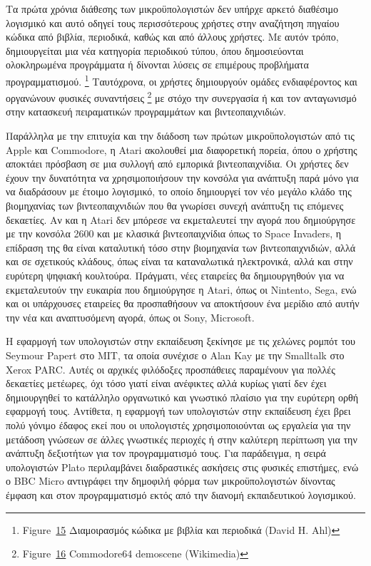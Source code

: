 \documentclass[
]{article}
\begin{document}
Τα πρώτα χρόνια διάθεσης των μικροϋπολογιστών δεν υπήρχε αρκετό
διαθέσιμο λογισμικό και αυτό οδηγεί τους περισσότερους χρήστες στην
αναζήτηση πηγαίου κώδικα από βιβλία, περιοδικά, καθώς και από άλλους
χρήστες. Με αυτόν τρόπο, δημιουργείται μια νέα κατηγορία περιοδικού
τύπου, όπου δημοσιεύονται ολοκληρωμένα προγράμματα ή δίνονται λύσεις σε
επιμέρους προβλήματα προγραμματισμού. \footnote{Figure~\protect\hyperlink{fig:printed-code}{15}
  Διαμοιρασμός κώδικα με βιβλία και περιοδικά (David H. Ahl)}
Ταυτόχρονα, οι χρήστες δημιουργούν ομάδες ενδιαφέροντος και οργανώνουν
φυσικές συναντήσεις \footnote{Figure~\protect\hyperlink{fig:c64-demoscene}{16}
  Commodore64 demoscene (Wikimedia)} με στόχο την συνεργασία ή και τον
ανταγωνισμό στην κατασκευή πειραματικών προγραμμάτων και
βιντεοπαιχνιδιών.

Παράλληλα με την επιτυχία και την διάδοση των πρώτων μικροϋπολογιστών
από τις Apple και Commodore, η Atari ακολουθεί μια διαφορετική πορεία,
όπου ο χρήστης αποκτάει πρόσβαση σε μια συλλογή από εμπορικά
βιντεοπαιχνίδια. Οι χρήστες δεν έχουν την δυνατότητα να χρησιμοποιήσουν
την κονσόλα για ανάπτυξη παρά μόνο για να διαδράσουν με έτοιμο
λογισμικό, το οποίο δημιουργεί τον νέο μεγάλο κλάδο της βιομηχανίας των
βιντεοπαιχνιδιών που θα γνωρίσει συνεχή ανάπτυξη τις επόμενες δεκαετίες.
Αν και η Atari δεν μπόρεσε να εκμεταλευτεί την αγορά που δημιούργησε με
την κονσόλα 2600 και με κλασικά βιντεοπαιχνίδια όπως το Space Invaders,
η επίδραση της θα είναι καταλυτική τόσο στην βιομηχανία των
βιντεοπαιχνιδιών, αλλά και σε σχετικούς κλάδους, όπως είναι τα
καταναλωτικά ηλεκτρονικά, αλλά και στην ευρύτερη ψηφιακή κουλτούρα.
Πράγματι, νέες εταιρείες θα δημιουργηθούν για να εκμεταλευτούν την
ευκαιρία που δημιούργησε η Atari, όπως οι Nintento, Sega, ενώ και οι
υπάρχουσες εταιρείες θα προσπαθήσουν να αποκτήσουν ένα μερίδιο από αυτήν
την νέα και αναπτυσόμενη αγορά, όπως οι Sony, Microsoft.

Η εφαρμογή των υπολογιστών στην εκπαίδευση ξεκίνησε με τις χελώνες
ρομπότ του Seymour Papert στο ΜΙΤ, τα οποία συνέχισε ο Alan Kay με την
Smalltalk στο Xerox PARC. Αυτές οι αρχικές φιλόδοξες προσπάθειες
παραμένουν για πολλές δεκαετίες μετέωρες, όχι τόσο γιατί είναι ανέφικτες
αλλά κυρίως γιατί δεν έχει δημιουργηθεί το κατάλληλο οργανωτικό και
γνωστικό πλαίσιο για την ευρύτερη ορθή εφαρμογή τους. Αντίθετα, η
εφαρμογή των υπολογιστών στην εκπαίδευση έχει βρει πολύ γόνιμο έδαφος
εκεί που οι υπολογιστές χρησιμοποιούνται ως εργαλεία για την μετάδοση
γνώσεων σε άλλες γνωστικές περιοχές ή στην καλύτερη περίπτωση για την
ανάπτυξη δεξιοτήτων για τον προγραμματισμό τους. Για παράδειγμα, η σειρά
υπολογιστών Plato περιλαμβάνει διαδραστικές ασκήσεις στις φυσικές
επιστήμες, ενώ ο BBC Micro αντιγράφει την δημοφιλή φόρμα των
μικροϋπολογιστών δίνοντας έμφαση και στον προγραμματισμό εκτός από την
διανομή εκπαιδευτικού λογισμικού.
\end{document}
